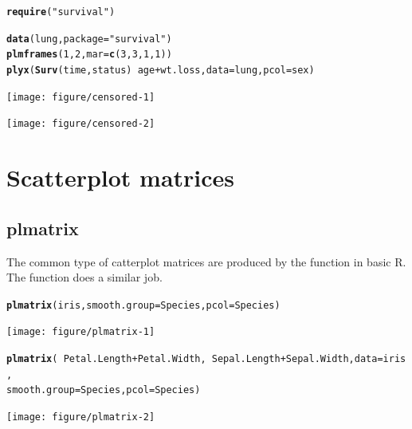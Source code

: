 \documentclass[11pt]{article}\usepackage[]{graphicx}\usepackage[]{color}
\makeatletter
\newcommand{\hlnum}[1]{\textcolor[rgb]{0.686,0.059,0.569}{#1}}%
\newcommand{\hlstr}[1]{\textcolor[rgb]{0.192,0.494,0.8}{#1}}%
\newcommand{\hlopt}[1]{\textcolor[rgb]{0,0,0}{#1}}%
\newcommand{\hlstd}[1]{\textcolor[rgb]{0.345,0.345,0.345}{#1}}%
\newcommand{\hlkwc}[1]{\textcolor[rgb]{0.333,0.667,0.333}{#1}}%
\newcommand{\hlkwd}[1]{\textcolor[rgb]{0.737,0.353,0.396}{\textbf{#1}}}%
\newenvironment{kframe}{%
 \def\at@end@of@kframe{}%
 \ifinner\ifhmode%
  \def\at@end@of@kframe{\end{minipage}}%
  \begin{minipage}{\columnwidth}%
 \fi\fi%
 \def\FrameCommand##1{\hskip\@totalleftmargin \hskip-\fboxsep
 \colorbox{shadecolor}{##1}\hskip-\fboxsep
     \hskip-\linewidth \hskip-\@totalleftmargin \hskip\columnwidth}%
 \MakeFramed {\advance\hsize-\width
   \@totalleftmargin\z@ \linewidth\hsize
   \@setminipage}}%
 {\par\unskip\endMakeFramed%
 \at@end@of@kframe}
\newenvironment{knitrout}{}{} %
\makeatother
\begin{document}
\begin{knitrout}
\color{fgcolor}\begin{kframe}
\begin{alltt}
\hlkwd{require}\hlstd{(}\hlstr{"survival"}\hlstd{)}
\end{alltt}


{\ttfamily\noindent\itshape\color{messagecolor}{\#\# Loading required package: survival}}\begin{alltt}
\hlkwd{data}\hlstd{(lung,} \hlkwc{package}\hlstd{=}\hlstr{"survival"}\hlstd{)}
\hlkwd{plmframes}\hlstd{(}\hlnum{1}\hlstd{,}\hlnum{2}\hlstd{,}\hlkwc{mar}\hlstd{=}\hlkwd{c}\hlstd{(}\hlnum{3}\hlstd{,}\hlnum{3}\hlstd{,}\hlnum{1}\hlstd{,}\hlnum{1}\hlstd{))}
\hlkwd{plyx}\hlstd{(}\hlkwd{Surv}\hlstd{(time,status)} \hlopt{~} \hlstd{age}\hlopt{+}\hlstd{wt.loss,} \hlkwc{data}\hlstd{=lung,} \hlkwc{pcol}\hlstd{=sex)}
\end{alltt}
\end{kframe}
\texttt{[image: figure/censored-1]} 

\texttt{[image: figure/censored-2]} 

\end{knitrout}


\section{Scatterplot matrices}
\subsection{plmatrix}
The common type of catterplot matrices are produced by the  function 
in basic R. The function  does a similar job.

\begin{knitrout}
\color{fgcolor}\begin{kframe}
\begin{alltt}
\hlkwd{plmatrix}\hlstd{(iris,} \hlkwc{smooth.group}\hlstd{=Species,} \hlkwc{pcol}\hlstd{=Species)}
\end{alltt}
\end{kframe}
\texttt{[image: figure/plmatrix-1]} 
\begin{kframe}\begin{alltt}
\hlkwd{plmatrix}\hlstd{(}\hlopt{~}\hlstd{Petal.Length}\hlopt{+}\hlstd{Petal.Width,} \hlopt{~}\hlstd{Sepal.Length}\hlopt{+}\hlstd{Sepal.Width,} \hlkwc{data}\hlstd{=iris,}
         \hlkwc{smooth.group}\hlstd{=Species,} \hlkwc{pcol}\hlstd{=Species)}
\end{alltt}
\end{kframe}
\texttt{[image: figure/plmatrix-2]} 

\end{knitrout}
\end{document}
